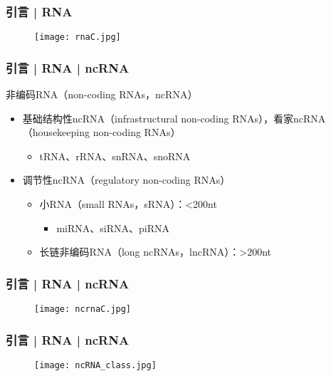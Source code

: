 \begin{frame}
  \frametitle{引言 | RNA}
  \begin{figure}
    \centering
    \texttt{[image: rnaC.jpg]}
  \end{figure}
\end{frame}

\begin{frame}
  \frametitle{引言 | RNA | ncRNA}
  \begin{block}{非编码RNA（non-coding RNAs，ncRNA）}
  \begin{itemize}
    \item 基础结构性ncRNA（infrastructural non-coding RNAs），看家ncRNA（housekeeping non-coding RNAs）
      \begin{itemize}
        \item tRNA、rRNA、snRNA、snoRNA
      \end{itemize}
    \item 调节性ncRNA（regulatory non-coding RNAs）
      \begin{itemize}
        \item 小RNA（small RNAs，sRNA）：\textless 200nt
          \begin{itemize}
            \item miRNA、siRNA、piRNA
          \end{itemize}
        \item 长链非编码RNA（long ncRNAs，lncRNA）：\textgreater 200nt
      \end{itemize}
  \end{itemize}
\end{block}
\end{frame}

\begin{frame}
  \frametitle{引言 | RNA | ncRNA}
  \begin{figure}
    \centering
    \texttt{[image: ncrnaC.jpg]}
  \end{figure}
\end{frame}

\begin{frame}
  \frametitle{引言 | RNA | ncRNA}
  \begin{figure}
    \centering
    \texttt{[image: ncRNA\_class.jpg]}
  \end{figure}
\end{frame}

